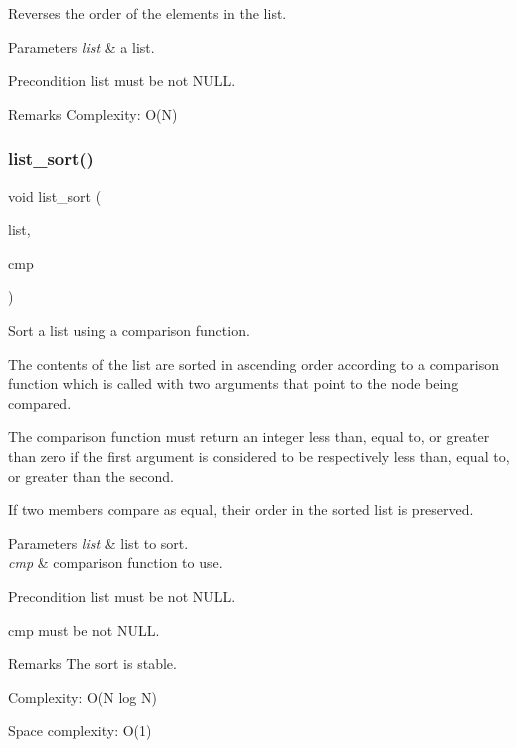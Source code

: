 Reverses the order of the elements in the list.


\begin{DoxyParams}{Parameters}
{\em list} & a list.\\
\hline
\end{DoxyParams}
\begin{DoxyPrecond}{Precondition}
{\ttfamily list} must be not N\+U\+LL.
\end{DoxyPrecond}
\begin{DoxyRemark}{Remarks}
Complexity\+: O(\+N) 
\end{DoxyRemark}
\mbox{\label{list_8h_aafd30da5da0e55fa5510328f579e7830}} 
\subsubsection{list\+\_\+sort()}
{\footnotesize\ttfamily void list\+\_\+sort (\begin{DoxyParamCaption}\item[{struct \textbf{ list} $\ast$}]{list,  }\item[{int($\ast$)(struct \textbf{ list\+\_\+node} $\ast$, struct \textbf{ list\+\_\+node} $\ast$)}]{cmp }\end{DoxyParamCaption})\hspace{0.3cm}{\ttfamily [inline]}}

Sort a list using a comparison function.

The contents of the list are sorted in ascending order according to a comparison function which is called with two arguments that point to the node being compared.

The comparison function must return an integer less than, equal to, or greater than zero if the first argument is considered to be respectively less than, equal to, or greater than the second.

If two members compare as equal, their order in the sorted list is preserved.


\begin{DoxyParams}{Parameters}
{\em list} & list to sort. \\
\hline
{\em cmp} & comparison function to use.\\
\hline
\end{DoxyParams}
\begin{DoxyPrecond}{Precondition}
{\ttfamily list} must be not N\+U\+LL. 

{\ttfamily cmp} must be not N\+U\+LL.
\end{DoxyPrecond}
\begin{DoxyRemark}{Remarks}
The sort is stable. 

Complexity\+: O(\+N log N) 

Space complexity\+: O(1) 
\end{DoxyRemark}
\mbox{\label{list_8h_ac55d3781f4c83cba6000c29161e3a419}} 
